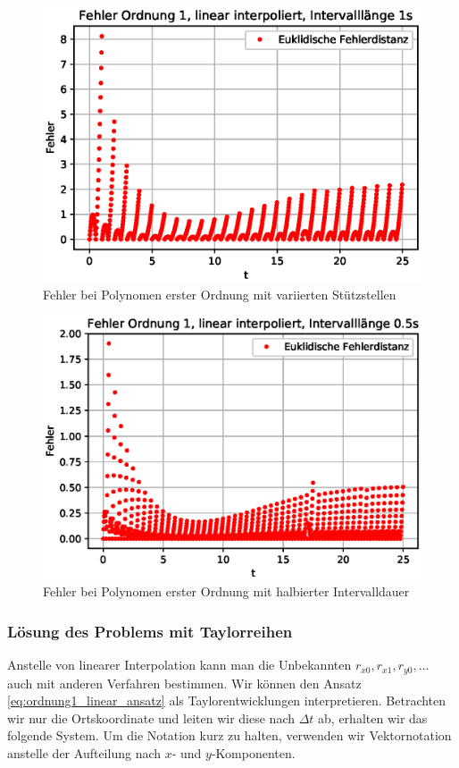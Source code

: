 \begin{figure}
	\centering
	\includegraphics[scale=0.7]{papers/perturbation/bilder/perturbation_fig7.eps}
	\caption{Fehler bei Polynomen erster Ordnung mit variierten Stützstellen}
	\label{fig:ordnung1_linear_error_B}
\end{figure}

\begin{figure}
	\centering
	\includegraphics[scale=0.7]{papers/perturbation/bilder/perturbation_fig8.eps}
	\caption{Fehler bei Polynomen erster Ordnung mit halbierter Intervalldauer}
	\label{fig:ordnung1_linear_error_C}
\end{figure}

\subsubsection{Lösung des Problems mit Taylorreihen}
Anstelle von linearer Interpolation kann man die Unbekannten $r_{x0}, r_{x1}, r_{y0}, \dots$ auch mit anderen Verfahren bestimmen.
Wir können den Ansatz \eqref{eq:ordnung1_linear_ansatz} als Taylorentwicklungen interpretieren.
Betrachten wir nur die Ortskoordinate und leiten wir diese nach $\Delta t$ ab, erhalten wir das folgende System.
Um die Notation kurz zu halten, verwenden wir Vektornotation anstelle der Aufteilung nach $x$- und $y$-Komponenten.

